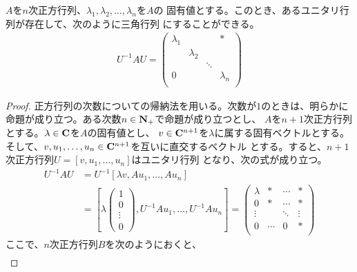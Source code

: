 {	\begin{proposition}[正方行列の三角化]\label{prop:正方行列の三角化} %
		$A$を$n$次正方行列、$\lambda_1,\lambda_2,\dots,\lambda_n$を$A$の
		固有値とする。このとき、あるユニタリ行列が存在して、次のように三角行列
		にすることができる。
		\begin{equation*}\begin{split}
			U^{-1}AU = 	\begin{pmatrix}
				\lambda_1 & & & * \\
				& \lambda_2 \\
				& & \ddots \\
				0 & & & \lambda_n \\
			\end{pmatrix}
		\end{split}\end{equation*}
	\end{proposition} %
	\begin{proof} %
		正方行列の次数についての帰納法を用いる。次数が$1$のときは、明らかに
		命題が成り立つ。ある次数$n\in\mathbf{N}_+$で命題が成り立つとし、
		$A$を$n+1$次正方行列とする。$\lambda\in\mathbf{C}$を$A$の固有値とし、
		$v\in\mathbf{C}^{n+1}$を$\lambda$に属する固有ベクトルとする。
		そして、$v,u_1,\dots,u_n\in\mathbf{C}^{n+1}$を互いに直交するベクトル
		とする。すると、$n+1$次正方行列$U=[v,u_1,\dots,u_n]$はユニタリ行列
		となり、次の式が成り立つ。
		\begin{equation*}\begin{split}
			U^{-1}AU &= U^{-1}[\lambda v,Au_1,\dots,Au_n] \\
			&= \left[\lambda\begin{pmatrix}
				1 \\ 0 \\ \vdots \\ 0
			\end{pmatrix},U^{-1}Au_1,\dots,U^{-1}Au_n\right] = \begin{pmatrix}
				\lambda & * & \cdots & * \\
				0 & * & \cdots & * \\
				\vdots & & \ddots & \vdots \\
				0 & \cdots & 0 & * \\
			\end{pmatrix}
		\end{split}\end{equation*}
		ここで、$n$次正方行列$B$を次のようにおくと、
		\begin{equation*}\begin{split}

\end{split}
\end{equation*}
\end{proof}}
